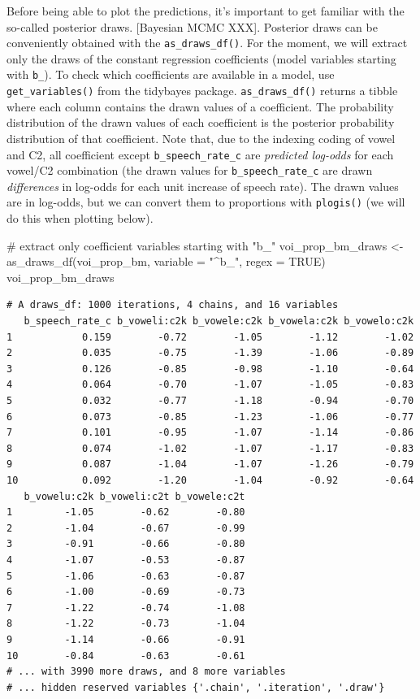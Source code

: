 \documentclass[
  authoryear,
  preprint,
  3p]{elsarticle}
\newenvironment{Shaded}{\begin{snugshade}}{\end{snugshade}}
\newcommand{\AttributeTok}[1]{\textcolor[rgb]{0.40,0.45,0.13}{#1}}
\newcommand{\CommentTok}[1]{\textcolor[rgb]{0.37,0.37,0.37}{#1}}
\newcommand{\ConstantTok}[1]{\textcolor[rgb]{0.56,0.35,0.01}{#1}}
\newcommand{\FunctionTok}[1]{\textcolor[rgb]{0.28,0.35,0.67}{#1}}
\newcommand{\NormalTok}[1]{\textcolor[rgb]{0.00,0.23,0.31}{#1}}
\newcommand{\OtherTok}[1]{\textcolor[rgb]{0.00,0.23,0.31}{#1}}
\newcommand{\StringTok}[1]{\textcolor[rgb]{0.13,0.47,0.30}{#1}}
\begin{document}
Before being able to plot the predictions, it's important to get
familiar with the so-called posterior draws. {[}Bayesian MCMC XXX{]}.
Posterior draws can be conveniently obtained with the
\texttt{as\_draws\_df()}. For the moment, we will extract only the draws
of the constant regression coefficients (model variables starting with
\texttt{b\_}). To check which coefficients are available in a model, use
\texttt{get\_variables()} from the tidybayes package.
\texttt{as\_draws\_df()} returns a tibble where each column contains the
drawn values of a coefficient. The probability distribution of the drawn
values of each coefficient is the posterior probability distribution of
that coefficient. Note that, due to the indexing coding of vowel and C2,
all coefficient except \texttt{b\_speech\_rate\_c} are \emph{predicted
log-odds} for each vowel/C2 combination (the drawn values for
\texttt{b\_speech\_rate\_c} are drawn \emph{differences} in log-odds for
each unit increase of speech rate). The drawn values are in log-odds,
but we can convert them to proportions with \texttt{plogis()} (we will
do this when plotting below).

\begin{Shaded}
\begin{Highlighting}[]
\CommentTok{\# extract only coefficient variables starting with "b\_"}
\NormalTok{voi\_prop\_bm\_draws }\OtherTok{\textless{}{-}} \FunctionTok{as\_draws\_df}\NormalTok{(voi\_prop\_bm, }\AttributeTok{variable =} \StringTok{"\^{}b\_"}\NormalTok{, }\AttributeTok{regex =} \ConstantTok{TRUE}\NormalTok{)}
\NormalTok{voi\_prop\_bm\_draws}
\end{Highlighting}
\end{Shaded}

\begin{verbatim}
# A draws_df: 1000 iterations, 4 chains, and 16 variables
   b_speech_rate_c b_voweli:c2k b_vowele:c2k b_vowela:c2k b_vowelo:c2k
1            0.159        -0.72        -1.05        -1.12        -1.02
2            0.035        -0.75        -1.39        -1.06        -0.89
3            0.126        -0.85        -0.98        -1.10        -0.64
4            0.064        -0.70        -1.07        -1.05        -0.83
5            0.032        -0.77        -1.18        -0.94        -0.70
6            0.073        -0.85        -1.23        -1.06        -0.77
7            0.101        -0.95        -1.07        -1.14        -0.86
8            0.074        -1.02        -1.07        -1.17        -0.83
9            0.087        -1.04        -1.07        -1.26        -0.79
10           0.092        -1.20        -1.04        -0.92        -0.64
   b_vowelu:c2k b_voweli:c2t b_vowele:c2t
1         -1.05        -0.62        -0.80
2         -1.04        -0.67        -0.99
3         -0.91        -0.66        -0.80
4         -1.07        -0.53        -0.87
5         -1.06        -0.63        -0.87
6         -1.00        -0.69        -0.73
7         -1.22        -0.74        -1.08
8         -1.22        -0.73        -1.04
9         -1.14        -0.66        -0.91
10        -0.84        -0.63        -0.61
# ... with 3990 more draws, and 8 more variables
# ... hidden reserved variables {'.chain', '.iteration', '.draw'}
\end{verbatim}
\end{document}

